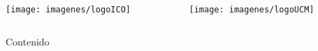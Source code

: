 \begin{frame}[plain]

\begin{columns}

	\begin{column}{5cm}
	\texttt{[image: imagenes/logoICO]}
	\end{column}

	\begin{column}{5cm}
	\begin{flushright}
	\texttt{[image: imagenes/logoUCM]}
	\end{flushright}
	\end{column}

\end{columns}
\maketitle

\end{frame}

 \begin{frame}{Contenido}
 \tableofcontents
 \end{frame}

